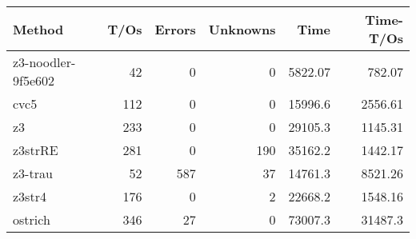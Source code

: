 \begin{tabular}{lrrrrr}
\hline
 Method             &   T/Os &   Errors &   Unknowns &     Time &   Time-T/Os \\
\hline
 z3-noodler-9f5e602 &     42 &        0 &          0 &  5822.07 &      782.07 \\
 cvc5               &    112 &        0 &          0 & 15996.6  &     2556.61 \\
 z3                 &    233 &        0 &          0 & 29105.3  &     1145.31 \\
 z3strRE            &    281 &        0 &        190 & 35162.2  &     1442.17 \\
 z3-trau            &     52 &      587 &         37 & 14761.3  &     8521.26 \\
 z3str4             &    176 &        0 &          2 & 22668.2  &     1548.16 \\
 ostrich            &    346 &       27 &          0 & 73007.3  &    31487.3  \\
\hline
\end{tabular}
